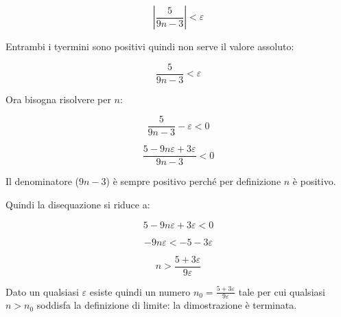 \begin{equation*}
\left|
\frac{
5
}{9n-3}
\right| < \varepsilon
\end{equation*}

Entrambi i tyermini sono positivi quindi non serve il valore assoluto:

\begin{equation*}
\frac{
5
}{9n-3}
< \varepsilon
\end{equation*}

Ora bisogna risolvere per $n$:

\begin{equation*}
\frac{
5
}{9n-3}
- \varepsilon <0
\end{equation*}


\begin{equation*}
\frac{5 -9n\varepsilon +3\varepsilon
}{9n-3
} < 0
\end{equation*}

Il denominatore ($9n-3$) è sempre positivo perché per definizione $n$ è positivo.

Quindi la disequazione si riduce a:

\begin{equation*}
5-9n\varepsilon +3\varepsilon < 0
\end{equation*}

\begin{equation*}
-9n\varepsilon < -5 -3\varepsilon
\end{equation*}

\begin{equation*}
n > \frac{5+3\varepsilon}{9\varepsilon}
\end{equation*}

Dato un qualsiasi $\varepsilon$ esiste quindi un numero $n_0 = \frac{5+3\varepsilon}{9\varepsilon}$ tale per cui qualsiasi $n>n_0$ soddisfa la definizione di limite: la dimostrazione è terminata.
